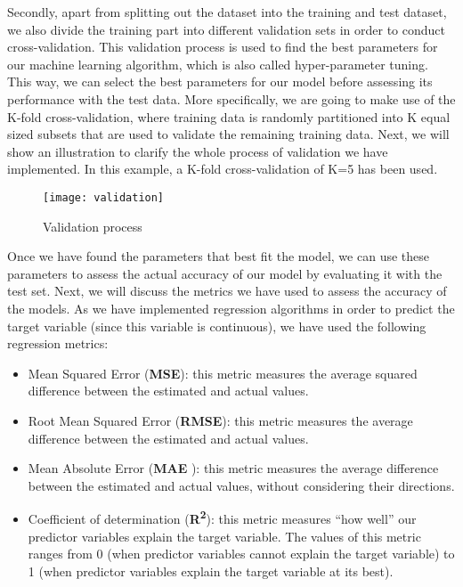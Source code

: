 Secondly, apart from splitting out the dataset into the training and test dataset, we also divide the training part into different validation sets in order to conduct cross-validation. This validation process is used to find the best parameters for our machine learning algorithm, which is also called hyper-parameter tuning. This way, we can select the best parameters for our model before assessing its performance with the test data. More specifically, we are going to make use of the K-fold cross-validation, where training data is randomly partitioned into K equal sized subsets that are used to validate the remaining training data. Next, we will show an illustration to clarify the whole process of validation we have implemented. In this example, a K-fold cross-validation of K=5 has been used.\\

\begin{figure}[H]
	\centering
	\texttt{[image: validation]}
	\caption{Validation process}
\end{figure}

Once we have found the parameters that best fit the model, we can use these parameters to assess the actual accuracy of our model by evaluating it with the test set. Next, we will discuss the metrics we have used to assess the accuracy of the models. As we have implemented regression algorithms in order to predict the target variable (since this variable is continuous), we have used the following regression metrics:

\begin{itemize}

	\item Mean Squared Error (\textbf{MSE}): this metric measures the average squared difference between the estimated and actual values.
	
	\item Root Mean Squared Error (\textbf{RMSE}): this metric measures the average difference between the estimated and actual values.
	
	\item Mean Absolute Error (\textbf{MAE} ): this metric measures the average difference between the estimated and actual values, without considering their directions.
	
	\item Coefficient of determination (\textbf{R\textsuperscript{2}}): this metric measures “how well” our predictor variables explain the target variable. The values of this metric ranges from 0 (when predictor variables cannot explain the target variable) to 1 (when predictor variables explain the target variable at its best).

\end{itemize}

